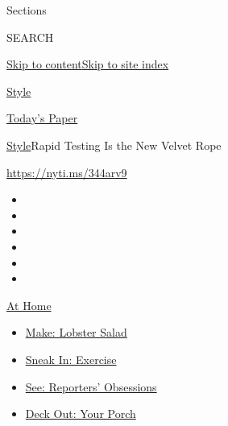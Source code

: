 Sections

SEARCH

\protect\hyperlink{site-content}{Skip to
content}\protect\hyperlink{site-index}{Skip to site index}

\href{https://www.nytimes3xbfgragh.onion/section/style}{Style}

\href{https://myaccount.nytimes3xbfgragh.onion/auth/login?response_type=cookie\&client_id=vi}{}

\href{https://www.nytimes3xbfgragh.onion/section/todayspaper}{Today's
Paper}

\href{/section/style}{Style}\textbar{}Rapid Testing Is the New Velvet
Rope

\url{https://nyti.ms/344arv9}

\begin{itemize}
\item
\item
\item
\item
\item
\item
\end{itemize}

\href{https://www.nytimes3xbfgragh.onion/spotlight/at-home?action=click\&pgtype=Article\&state=default\&region=TOP_BANNER\&context=at_home_menu}{At
Home}

\begin{itemize}
\tightlist
\item
  \href{https://www.nytimes3xbfgragh.onion/2020/08/14/dining/lobster-salad-recipe.html?action=click\&pgtype=Article\&state=default\&region=TOP_BANNER\&context=at_home_menu}{Make:
  Lobster Salad}
\item
  \href{https://www.nytimes3xbfgragh.onion/2020/08/15/at-home/coronavirus-at-home-quick-exercises.html?action=click\&pgtype=Article\&state=default\&region=TOP_BANNER\&context=at_home_menu}{Sneak
  In: Exercise}
\item
  \href{https://www.nytimes3xbfgragh.onion/interactive/2020/at-home/even-more-reporters-editors-diaries-lists-recommendations.html?action=click\&pgtype=Article\&state=default\&region=TOP_BANNER\&context=at_home_menu}{See:
  Reporters' Obsessions}
\item
  \href{https://www.nytimes3xbfgragh.onion/2020/08/15/at-home/coronavirus-fall-patio-furniture.html?action=click\&pgtype=Article\&state=default\&region=TOP_BANNER\&context=at_home_menu}{Deck
  Out: Your Porch}
\end{itemize}

